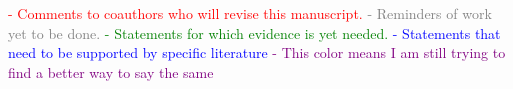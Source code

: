 
\textcolor{red}{- Comments to coauthors who will revise this manuscript.}\newline
\textcolor{gray}{- Reminders of work yet to be done.}\newline
\textcolor{green}{- Statements for which evidence is yet needed.}\newline
\textcolor{blue}{- Statements that need to be supported by specific literature}\newline
\textcolor{purple}{- This color means I am still trying to find a better way to say the same}\newline

